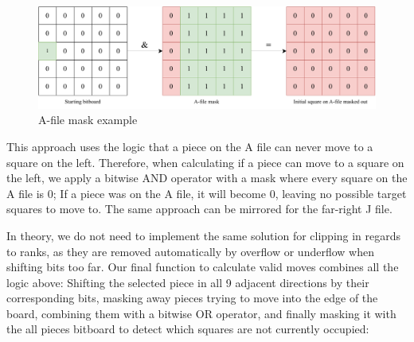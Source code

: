 \documentclass[../main/main.tex]{subfiles}
\begin{document}
\begin{figure}[H]
    \centering
    \includegraphics[width=\columnwidth]{../design/assets/bitboard_masked.pdf}
    \caption{A-file mask example}
    \label{fig:bitboard-masked}
\end{figure}

This approach uses the logic that a piece on the A file can never move to a square on the left. Therefore, when calculating if a piece can move to a square on the left, we apply a bitwise AND operator with a mask where every square on the A file is 0; If a piece was on the A file, it will become 0, leaving no possible target squares to move to. The same approach can be mirrored for the far-right J file.

In theory, we do not need to implement the same solution for clipping in regards to ranks, as they are removed automatically by overflow or underflow when shifting bits too far.
Our final function to calculate valid moves combines all the logic above: Shifting the selected piece in all 9 adjacent directions by their corresponding bits, masking away pieces trying to move into the edge of the board, combining them with a bitwise OR operator, and finally masking it with the all pieces bitboard to detect which squares are not currently occupied:
\end{document}
